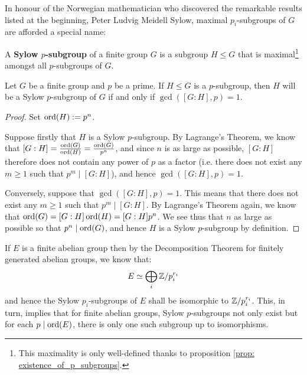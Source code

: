         In honour of the Norwegian mathematician who discovered the remarkable results listed at the beginning, Peter Ludvig Meidell Sylow, maximal $p_i$-subgroups of $G$ are afforded a special name:
        \begin{definition} \label{def: sylow_subgroups}
            A \textbf{Sylow $p$-subgroup} of a finite group $G$ is a subgroup $H \leq G$ that is maximal\footnote{This maximality is only well-defined thanks to proposition \ref{prop: existence_of_p_subgroups}.} amongst all $p$-subgroups of $G$.
        \end{definition}
        \begin{lemma} \label{lemma: maximality_criterion_for_p_subgroups}
            Let $G$ be a finite group and $p$ be a prime. If $H \leq G$ is a $p$-subgroup, then $H$ will be a Sylow $p$-subgroup of $G$ if and only if $\gcd( [G : H], p ) = 1$. 
        \end{lemma}
            \begin{proof}
                Set $\operatorname{ord}(H) := p^n$.
            
                Suppose firstly that $H$ is a Sylow $p$-subgroup. By Lagrange's Theorem, we know that $[G : H] = \frac{\operatorname{ord}(G)}{\operatorname{ord}(H)} = \frac{\operatorname{ord}(G)}{p^n}$, and since $n$ is as large as possible, $[G : H]$ therefore does not contain any power of $p$ as a factor (i.e. there does not exist any $m \geq 1$ such that $p^m \mid [G : H]$), and hence $\gcd( [G : H], p ) = 1$.

                Conversely, suppose that $\gcd([G : H], p) = 1$. This means that there does not exist any $m \geq 1$ such that $p^m \mid [G : H]$. By Lagrange's Theorem again, we know that $\operatorname{ord}(G) = [G : H] \operatorname{ord}(H) = [G : H] p^n$. We see thus that $n$ as large as possible so that $p^n \mid \operatorname{ord}(G)$, and hence $H$ is a Sylow $p$-subgroup by definition. 
            \end{proof}
        \begin{example} \label{example: abelian_sylow_subgroups}
            If $E$ is a finite abelian group then by the Decomposition Theorem for finitely generated abelian groups, we know that:
                $$E \simeq \bigoplus_i \mathbb{Z}/p_i^{r_i}$$
            and hence the Sylow $p_i$-subgroups of $E$ shall be isomorphic to $\mathbb{Z}/p_i^{r_i}$. This, in turn, implies that for finite abelian groups, Sylow $p$-subgroups not only exist but for each $p \mid \operatorname{ord}(E)$, there is only one such subgroup up to isomorphisms.
        \end{example}
        
